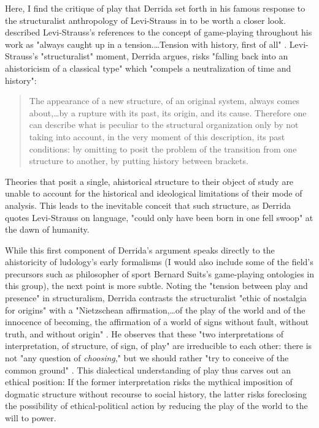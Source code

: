 Here, I find the critique of play that Derrida set forth in his famous response to the structuralist anthropology of Levi-Strauss in  to be worth a closer look. \citeauthor{Derrida1978-ix} described Levi-Strauss's references to the concept of game-playing throughout his work as "always caught up in a tension.…Tension with history, first of all" \autocite[367]{Derrida1978-ix}. Levi-Strauss's "structuralist" moment, Derrida argues, risks "falling back into an ahistoricism of a classical type" which "compels a neutralization of time and history":
\blockcquote[368]{Derrida1978-ix}{
  The appearance of a new structure, of an original system, always comes about,…by a rupture with its past, its origin, and its cause. Therefore one can describe what is peculiar to the structural organization only by not taking into account, in the very moment of this description, its past conditions: by omitting to posit the problem of the transition from one structure to another, by putting history between brackets.}
Theories that posit a single, ahistorical structure to their object of study are unable to account for the historical and ideological limitations of their mode of analysis. This leads to the inevitable conceit that such structure, as Derrida quotes Levi-Strauss on language, "could only have been born in one fell swoop" at the dawn of humanity.

While this first component of Derrida's argument speaks directly to the ahistoricity of ludology's early formalisms (I would also include some of the field's precursors such as philosopher of sport Bernard Suits's game-playing ontologies in this group), the next point is more subtle. Noting the "tension between play and presence" in structuralism, Derrida contrasts the structuralist "ethic of nostalgia for origins" with a "Nietzschean affirmation,…of the play of the world and of the innocence of becoming, the affirmation of a world of signs without fault, without truth, and without origin" \autocite[369]{Derrida1978-ix}. He observes that these "two interpretations of interpretation, of structure, of sign, of play" are irreducible to each other: there is not "any question of \emph{choosing}," but we should rather "try to conceive of the common ground" \autocite[369--70]{Derrida1978-ix}. This dialectical understanding of play thus carves out an ethical position: If the former interpretation risks the mythical imposition of dogmatic structure without recourse to social history, the latter risks foreclosing the possibility of ethical-political action by reducing the play of the world to the will to power.

